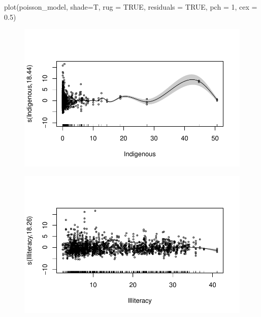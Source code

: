 \documentclass[
  letterpaper,
  DIV=11,
  numbers=noendperiod]{scrartcl}
\newenvironment{Shaded}{\begin{snugshade}}{\end{snugshade}}
\newcommand{\AttributeTok}[1]{\textcolor[rgb]{0.40,0.45,0.13}{#1}}
\newcommand{\ConstantTok}[1]{\textcolor[rgb]{0.56,0.35,0.01}{#1}}
\newcommand{\DecValTok}[1]{\textcolor[rgb]{0.68,0.00,0.00}{#1}}
\newcommand{\FloatTok}[1]{\textcolor[rgb]{0.68,0.00,0.00}{#1}}
\newcommand{\FunctionTok}[1]{\textcolor[rgb]{0.28,0.35,0.67}{#1}}
\newcommand{\NormalTok}[1]{\textcolor[rgb]{0.00,0.23,0.31}{#1}}
\begin{document}
\begin{Shaded}
\begin{Highlighting}[]
\FunctionTok{plot}\NormalTok{(poisson\_model, }\AttributeTok{shade=}\NormalTok{T, }\AttributeTok{rug =} \ConstantTok{TRUE}\NormalTok{, }\AttributeTok{residuals =} \ConstantTok{TRUE}\NormalTok{,}
\AttributeTok{pch =} \DecValTok{1}\NormalTok{, }\AttributeTok{cex =} \FloatTok{0.5}\NormalTok{)}
\end{Highlighting}
\end{Shaded}

\begin{figure}[H]

{\centering \includegraphics{Group34Coursework_files/figure-pdf/unnamed-chunk-9-1.pdf}

}

\end{figure}

\begin{figure}[H]

{\centering \includegraphics{Group34Coursework_files/figure-pdf/unnamed-chunk-9-2.pdf}

}

\end{figure}
\end{document}
